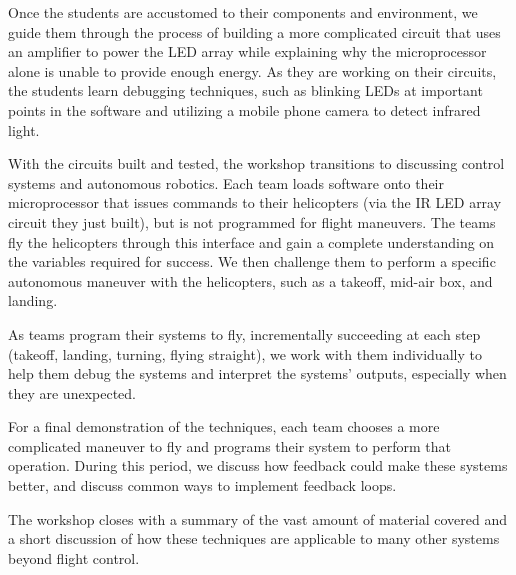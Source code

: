 \documentclass[11pt]{article}
\begin{document}
Once the students are accustomed to their components and environment, we guide them through the process of building a more complicated circuit that uses an amplifier to power the LED array while explaining why the microprocessor alone is unable to provide enough energy.  As they are working on their circuits, the students learn debugging techniques, such as blinking LEDs at important points in the software and utilizing a mobile phone camera to detect infrared light.

With the circuits built and tested, the workshop transitions to discussing control systems and autonomous robotics.  Each team loads software onto their microprocessor that issues commands to their helicopters (via the IR LED array circuit they just built), but is not programmed for flight maneuvers.  The teams fly the helicopters through this interface and gain a complete understanding on the variables required for success.  We then challenge them to perform a specific autonomous maneuver with the helicopters, such as a takeoff, mid-air box, and landing.

As teams program their systems to fly, incrementally succeeding at each step (takeoff, landing, turning, flying straight), we work with them individually to help them debug the systems and interpret the systems’ outputs, especially when they are unexpected.

For a final demonstration of the techniques, each team chooses a more complicated maneuver to fly and programs their system to perform that operation.  During this period, we discuss how feedback could make these systems better, and discuss common ways to implement feedback loops.

The workshop closes with a summary of the vast amount of material covered and a short discussion of how these techniques are applicable to many other systems beyond flight control.







%

\end{document}
